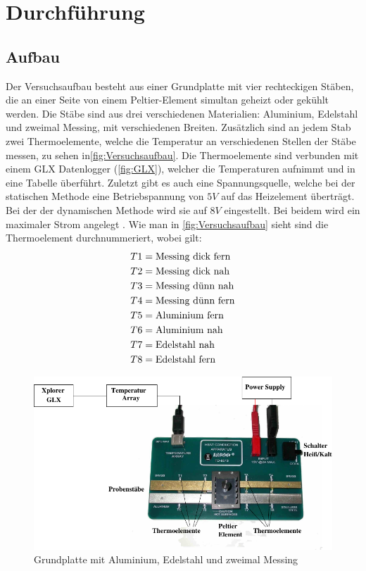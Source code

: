 \section{Durchführung}
\label{sec:Durchführung}


\subsection{Aufbau}
Der Versuchsaufbau besteht aus einer Grundplatte mit vier rechteckigen Stäben, die an einer Seite von einem Peltier-Element simultan geheizt oder gekühlt werden.
Die Stäbe sind aus drei verschiedenen Materialien:  Aluminium, Edelstahl und zweimal Messing, mit verschiedenen Breiten.
Zusätzlich sind an jedem Stab zwei Thermoelemente, welche die Temperatur an verschiedenen Stellen der Stäbe messen, zu sehen in\autoref{fig:Versuchsaufbau}.
Die Thermoelemente sind verbunden mit einem GLX Datenlogger (\autoref{fig:GLX}), welcher die Temperaturen aufnimmt und in eine Tabelle überführt.
Zuletzt gibt es auch eine Spannungsquelle, welche bei der statischen Methode eine Betriebspannung von $5\si{V}$ auf das Heizelement überträgt. 
Bei der der dynamischen Methode wird sie auf $8\si{V}$ eingestellt. Bei beidem wird ein maximaler Strom angelegt .
Wie man in \autoref{fig:Versuchsaufbau} sieht sind die Thermoelement durchnummeriert, wobei gilt:
\begin{align}
    T1 &= \text{Messing dick fern} \notag \\
    T2 &= \text{Messing dick nah} \notag \\
    T3 &= \text{Messing dünn nah} \notag \\
    T4 &= \text{Messing dünn fern} \notag \\
    T5 &= \text{Aluminium fern} \notag \\
    T6 &= \text{Aluminium nah} \notag \\
    T7 &= \text{Edelstahl nah} \notag \\
    T8 &= \text{Edelstahl fern} \notag
\end{align}
\begin{figure}[H]
    \centering
    \includegraphics{content/Abb_1.pdf}
    \caption{Grundplatte mit Aluminium, Edelstahl und zweimal Messing\cite[3]{V204}}
    \label{fig:Versuchsaufbau}
\end{figure}

